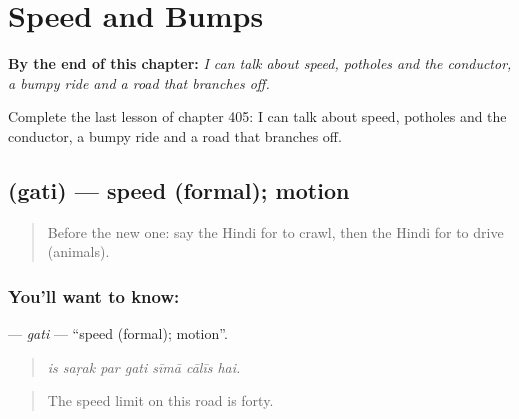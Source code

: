 
\chapter{Speed and Bumps}
\label{ch:hi-speed-and-bumps}

\begin{chapteropening}
\textbf{By the end of this chapter:} \emph{I can talk about speed, potholes and the conductor, a bumpy ride and a road that branches off.}

Complete the last lesson of chapter 405: I can talk about speed, potholes and the conductor, a bumpy ride and a road that branches off.
\end{chapteropening}

\section[\texorpdfstring{\hi{गति} (gati)}{गति (gati)}]{ (gati) — speed (formal); motion}

\label{lesson:HI-C405-gati}



\begin{quote}
Before the new one: say the Hindi for to crawl, then the Hindi for to drive (animals).
\end{quote}

\subsection*{You'll want to know: }
\textbf{} — \emph{gati} — \textquotedblleft{}speed (formal); motion\textquotedblright{}.

\begin{quote}
      
\end{quote}

\begin{quote}
\emph{is saṛak par gati sīmā cālīs hai.}
\end{quote}

\begin{quote}
The speed limit on this road is forty.
\end{quote}

